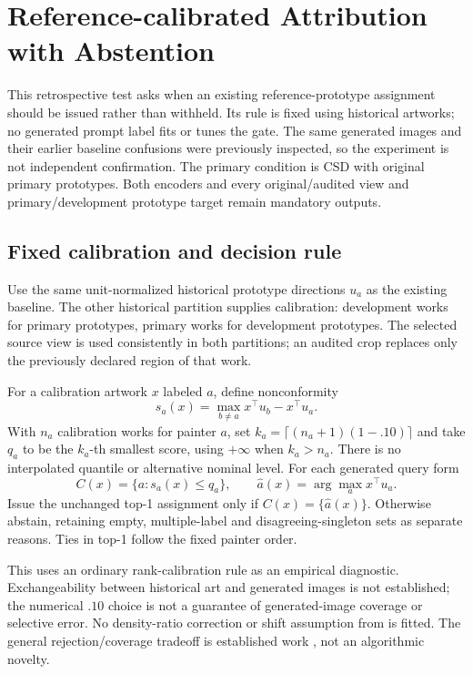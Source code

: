 \section{Reference-calibrated Attribution with Abstention}\label{app:selective}
This retrospective test asks when an existing reference-prototype assignment
should be issued rather than withheld. Its rule is fixed using historical
artworks; no generated prompt label fits or tunes the gate. The same generated
images and their earlier baseline confusions were previously inspected, so
the experiment is not independent confirmation. The primary condition is CSD
with original primary prototypes. Both encoders and every original/audited
view and primary/development prototype target remain mandatory outputs.

\subsection{Fixed calibration and decision rule}
Use the same unit-normalized historical prototype directions $u_a$ as the
existing baseline. The other historical partition supplies calibration:
development works for primary prototypes, primary works for development
prototypes. The selected source view is used consistently in both partitions;
an audited crop replaces only the previously declared region of that work.

For a calibration artwork $x$ labeled $a$, define nonconformity
\begin{equation}
 s_a(x)=\max_{b\ne a}x^\top u_b-x^\top u_a.
\end{equation}
With $n_a$ calibration works for painter $a$, set
$k_a=\lceil(n_a+1)(1-.10)\rceil$ and take $q_a$ to be the $k_a$-th smallest
score, using $+\infty$ when $k_a>n_a$. There is no interpolated quantile or
alternative nominal level. For each generated query form
\begin{equation}
 C(x)=\{a:s_a(x)\le q_a\},\qquad
 \hat a(x)=\arg\max_a x^\top u_a.
\end{equation}
Issue the unchanged top-1 assignment only if $C(x)=\{\hat a(x)\}$.
Otherwise abstain, retaining empty, multiple-label and disagreeing-singleton
sets as separate reasons. Ties in top-1 follow the fixed painter order.

This uses an ordinary rank-calibration rule as an empirical diagnostic.
Exchangeability between historical art and generated images is not established;
the numerical $.10$ choice is not a guarantee of generated-image coverage or
selective error. No density-ratio correction or shift assumption from
\citet{tibshirani2019shift} is fitted. The general rejection/coverage tradeoff
is established work \citep{geifman2017selective}, not an algorithmic novelty.


